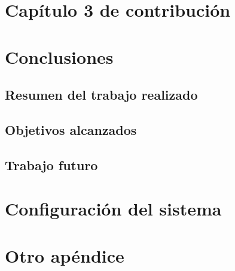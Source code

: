 \documentclass[11pt,spanish,listoffigures,listoftables]{tfgetsinf}
\begin{document}

\chapter{Capítulo 3 de contribución}   %


\chapter{Conclusiones}  %

\section{Resumen del trabajo realizado} %

\section{Objetivos alcanzados}         %

\section{Trabajo futuro}               %


\printbibliography 
\cleardoublepage


\APPENDIX

\chapter{Configuración del sistema}

\chapter{Otro apéndice}
\end{document}
